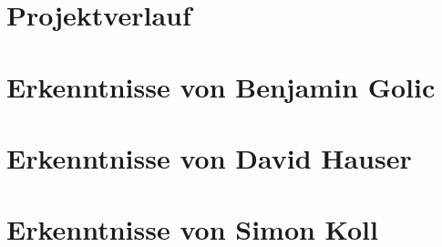 \section{Projektverlauf}
\lipsum[5-12]

\section{Erkenntnisse von Benjamin Golic}
\lipsum[5-12]

\section{Erkenntnisse von David Hauser}
\lipsum[5-12]

\section{Erkenntnisse von Simon Koll}
\lipsum[5-12]

